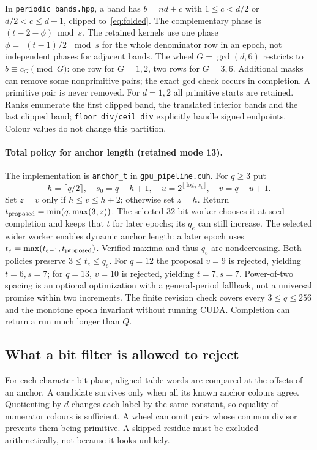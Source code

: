 \documentclass[11pt]{article}
\theoremstyle{definition}\newtheorem{remark}[theorem]{Remark}
\begin{document}
In \texttt{periodic\_bands.hpp}, a band has $b=nd+c$ with
$1\le c<d/2$ or $d/2<c\le d-1$, clipped to~\eqref{eq:folded}.
The complementary phase is $(t-2-\phi)\bmod s$. The retained kernels use
one phase $\phi=\lfloor(t-1)/2\rfloor\bmod s$ for the whole denominator
row in an epoch, not independent phases for adjacent bands. The wheel
$G=\gcd(d,6)$ restricts to $b\equiv c_G\pmod G$: one row for $G=1,2$,
two rows for $G=3,6$. Additional masks can remove some nonprimitive pairs;
the exact gcd check occurs in completion. A primitive pair is never removed.
For $d=1,2$ all primitive starts are retained.
Ranks enumerate the first clipped band, the translated interior bands and
the last clipped band; \texttt{floor\_div}/\texttt{ceil\_div} explicitly
handle signed endpoints. Colour values do not change this partition.

\paragraph{Total policy for anchor length (retained mode 13).}
The implementation is \texttt{anchor\_t} in \texttt{gpu\_pipeline.cuh}.
For $q\ge3$ put
\[
 h=\lceil q/2\rceil,\quad s_0=q-h+1,\quad
 u=2^{\lfloor\log_2s_0\rfloor},\quad v=q-u+1.
\]
Set $z=v$ only if $h\le v\le h+2$; otherwise set $z=h$. Return
$t_{\rm proposed}=\min(q,\max(3,z))$. The selected 32-bit worker chooses
it at seed completion and keeps that $t$ for later epochs; its $q_e$ can
still increase. The selected wider worker enables dynamic anchor length:
a later epoch uses $t_e=\max(t_{e-1},t_{\rm proposed})$. Verified maxima
and thus $q_e$ are nondecreasing. Both policies preserve $3\le t_e\le q_e$.
For $q=12$ the proposal $v=9$ is rejected, yielding $t=6,s=7$; for
$q=13$, $v=10$ is rejected, yielding $t=7,s=7$. Power-of-two spacing is
an optional optimization with a general-period fallback, not a universal
promise within two increments. The finite revision check covers every
$3\le q\le256$ and the monotone epoch invariant without running CUDA.
Completion can return a run much longer than $Q$.


\subsection{What a bit filter is allowed to reject}
For each character bit plane, aligned table words are compared at the
offsets of an anchor. A candidate survives only when all its known anchor
colours agree. Quotienting by $d$ changes each label by the same constant,
so equality of numerator colours is sufficient. A wheel can omit pairs
whose common divisor prevents them being primitive. A skipped residue
must be excluded arithmetically, not because it looks unlikely.
\end{document}
